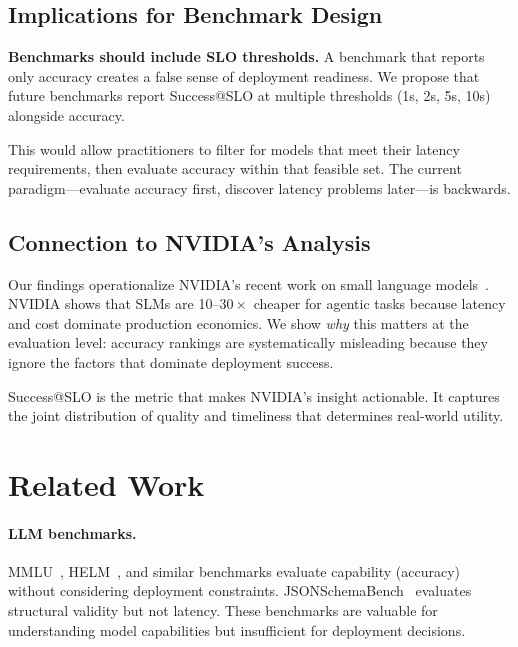 \documentclass[11pt]{article}
\begin{document}
\subsection{Implications for Benchmark Design}

\textbf{Benchmarks should include SLO thresholds.}
A benchmark that reports only accuracy creates a false sense of deployment readiness.
We propose that future benchmarks report Success@SLO at multiple thresholds (1s, 2s, 5s, 10s) alongside accuracy.

This would allow practitioners to filter for models that meet their latency requirements, then evaluate accuracy within that feasible set.
The current paradigm---evaluate accuracy first, discover latency problems later---is backwards.

\subsection{Connection to NVIDIA's Analysis}

Our findings operationalize NVIDIA's recent work on small language models~\citep{nvidia2025slm}.
NVIDIA shows that SLMs are 10--$30\times$ cheaper for agentic tasks because latency and cost dominate production economics.
We show \emph{why} this matters at the evaluation level: accuracy rankings are systematically misleading because they ignore the factors that dominate deployment success.

Success@SLO is the metric that makes NVIDIA's insight actionable.
It captures the joint distribution of quality and timeliness that determines real-world utility.

\section{Related Work}
\label{sec:related}

\paragraph{LLM benchmarks.}
MMLU~\citep{hendrycks2021mmlu}, HELM~\citep{liang2022helm}, and similar benchmarks evaluate capability (accuracy) without considering deployment constraints.
JSONSchemaBench~\citep{geng2025jsonschemabench} evaluates structural validity but not latency.
These benchmarks are valuable for understanding model capabilities but insufficient for deployment decisions.
\end{document}

